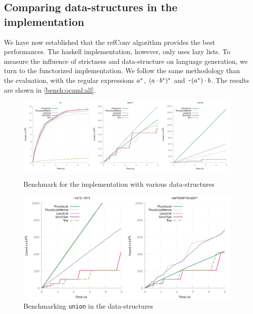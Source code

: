 \subsection{Comparing data-structures in the \ocaml implementation}

We have now established that the refConv algorithm provides the best performances.
The haskell implementation, however, only uses lazy lists. To measure
the influence of strictness and data-structure on language generation,
we turn to the functorized \ocaml implementation.
We follow the same methodology than the \haskell evaluation,
with the regular expressions
$a^*$, $(a \cdot{b^*})^*$ and
$\texttt{\textasciitilde}{(a^*)} \cdot{b}$.
The results are shown in \cref{bench:ocaml:all}.

\begin{figure}[b]
  \centering
  \includegraphics[height=0.33\linewidth]{measure/ocaml_all.png}
  \caption{Benchmark for the \ocaml implementation with various data-structures}
  \label{bench:ocaml:all}
  \includegraphics[height=0.33\linewidth]{measure/ocaml_union.png}
  \caption{Benchmarking \texttt{union} in the \ocaml data-structures}
  \label{bench:ocaml:union}
\end{figure}


